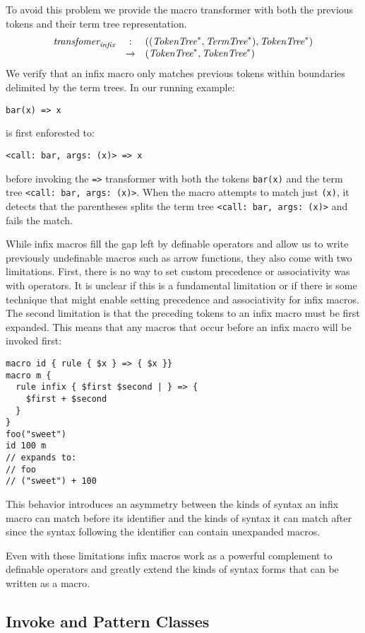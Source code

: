 \documentclass[preprint,10pt]{sigplanconf}
\begin{document}
To avoid this problem we provide the macro transformer with both the
previous tokens and their term tree representation.
\[
\begin{array}{rcl}
  \textit{transfomer}_{\textit{infix}} &:& ((\textit{TokenTree}^*, \textit{TermTree}^{*}), \textit{TokenTree}^*) 
  \\
  &\rightarrow& (\textit{TokenTree}^*, \textit{TokenTree}^*)
\end{array}
\]
We verify that an infix macro only
matches previous tokens within boundaries delimited by 
the term trees. In our running example:
\begin{lstlisting}
bar(x) => x
\end{lstlisting}
is first enforested to:
\begin{lstlisting}
<call: bar, args: (x)> => x
\end{lstlisting}
before invoking the \lstinline!=>! transformer with both the tokens
\lstinline!bar(x)! and the term tree
\lstinline!<call: bar, args: (x)>!. When the macro attempts to match
just \lstinline!(x)!, it detects that the parentheses splits the term
tree \lstinline!<call: bar, args: (x)>! and fails the match.

While infix macros fill the gap left by definable operators and allow
us to write previously undefinable macros such as arrow functions,
they also come with two limitations. First, there is no way to set
custom precedence or associativity was with operators. It is unclear
if this is a fundamental limitation or if there is some technique that
might enable setting precedence and associativity for infix macros.
The second limitation is that the preceding tokens to an infix macro
must be first expanded. This means that any macros that occur before
an infix macro will be invoked first:
\begin{lstlisting}
macro id { rule { $x } => { $x }}
macro m {
  rule infix { $first $second | } => {
    $first + $second   
  }
}
foo("sweet")
id 100 m
// expands to:
// foo
// ("sweet") + 100
\end{lstlisting}
This behavior introduces an asymmetry between the kinds of syntax an
infix macro can match before its identifier and the kinds of syntax it
can match after since the syntax following the identifier can contain
unexpanded macros.

Even with these limitations infix macros work as a powerful complement
to definable operators and greatly extend the kinds of syntax forms
that can be written as a macro.

\subsection{Invoke and Pattern Classes}
\label{sec:invoke}
\end{document}

